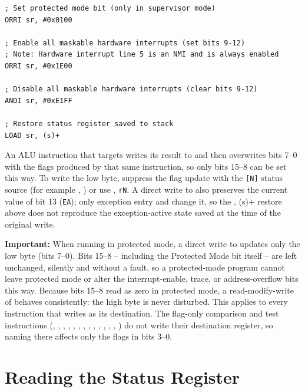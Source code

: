 \begin{lstlisting}
; Set protected mode bit (only in supervisor mode)
ORRI sr, #0x0100

; Enable all maskable hardware interrupts (set bits 9-12)
; Note: Hardware interrupt line 5 is an NMI and is always enabled
ORRI sr, #0x1E00

; Disable all maskable hardware interrupts (clear bits 9-12)
ANDI sr, #0xE1FF

; Restore status register saved to stack
LOAD sr, (s)+

\end{lstlisting}

An ALU instruction that targets  writes its result to  and then overwrites bits 7--0 with the flags
produced by that same instruction, so only bits 15--8 can be set this way. To write the low byte, suppress the flag
update with the \texttt{[N]} status source (for example  , ) or use
 , \texttt{rN}. A direct write to  also preserves the current value of bit 13
(\texttt{EA}); only exception entry and  change it, so the  , (s)+ restore above
does not reproduce the exception-active state saved at the time of the original write.

\textbf{Important:} When running in protected mode, a direct write to  updates only the low byte (bits 7--0).
Bits 15--8 -- including the Protected Mode bit itself -- are left unchanged, silently and without a fault, so a
protected-mode program cannot leave protected mode or alter the interrupt-enable, trace, or address-overflow bits this
way. Because bits 15--8 read as zero in protected mode, a read-modify-write of  behaves consistently: the high
byte is never disturbed. This applies to every instruction that writes  as its destination. The
flag-only comparison and test instructions (, , , ,
, , , , , ,
, , , ) do not write their destination register, so naming
 there affects only the flags in bits 3--0.

\section{Reading the Status Register}

